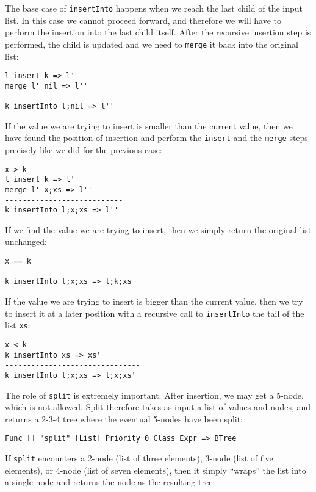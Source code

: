 The base case of \texttt{insertInto} happens when we reach the last child of the input list. In this case we cannot proceed forward, and therefore we will have to perform the insertion into the last child itself. After the recursive insertion step is performed, the child is updated and we need to \texttt{merge} it back into the original list:

\begin{lstlisting}
l insert k => l'
merge l' nil => l''
---------------------------
k insertInto l;nil => l''
\end{lstlisting}

If the value we are trying to insert is smaller than the current value, then we have found the position of insertion and perform the \texttt{insert} and the \texttt{merge} steps precisely like we did for the previous case:

\begin{lstlisting}
x > k
l insert k => l'
merge l' x;xs => l''
---------------------------
k insertInto l;x;xs => l''
\end{lstlisting}

If we find the value we are trying to insert, then we simply return the original list unchanged:

\begin{lstlisting}
x == k
------------------------------
k insertInto l;x;xs => l;k;xs
\end{lstlisting}

If the value we are trying to insert is bigger than the current value, then we try to insert it at a later position with a recursive call to \texttt{insertInto} the tail of the list \texttt{xs}:

\begin{lstlisting}
x < k
k insertInto xs => xs'
-------------------------------
k insertInto l;x;xs => l;x;xs'
\end{lstlisting}

The role of \texttt{split} is extremely important. After insertion, we may get a 5-node, which is not allowed. Split therefore takes as input a list of values and nodes, and returns a 2-3-4 tree where the eventual 5-nodes have been split:

\begin{lstlisting}
Func [] "split" [List] Priority 0 Class Expr => BTree
\end{lstlisting}

If \texttt{split} encounters a 2-node (list of three elements), 3-node (list of five elements), or 4-node (list of seven elements), then it simply ``wraps'' the list into a single node and returns the node as the resulting tree:

